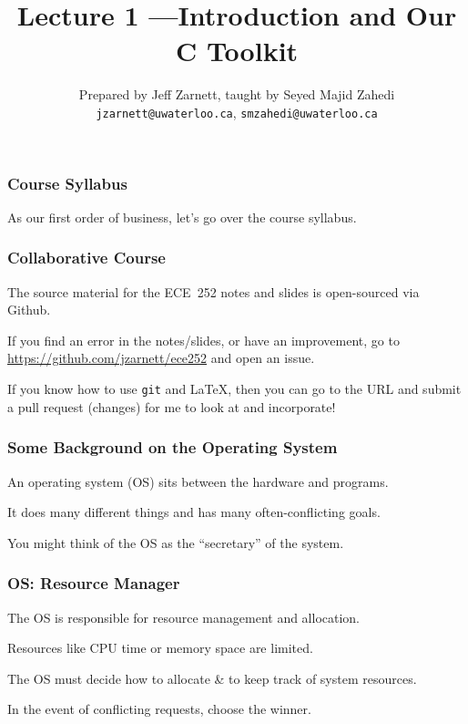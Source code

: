 

\title{Lecture 1 ---Introduction and Our C Toolkit }

\author{Prepared by Jeff Zarnett, taught by Seyed Majid Zahedi \\ \small \texttt{jzarnett@uwaterloo.ca}, \texttt{smzahedi@uwaterloo.ca}}
\date{}




\begin{frame}
	\titlepage

\end{frame}

\begin{frame}
	\frametitle{Course Syllabus}

	As our first order of business, let's go over the course syllabus.

\end{frame}

\begin{frame}
	\frametitle{Collaborative Course}

	The source material for the ECE~252 notes and slides is open-sourced via Github.

	If you find an error in the notes/slides, or have an improvement, go to \url{https://github.com/jzarnett/ece252} and open an issue.

	If you know how to use \texttt{git} and \LaTeX, then you can go to the URL and submit a pull request (changes) for me to look at and incorporate!


\end{frame}

\begin{frame}
	\frametitle{Some Background on the Operating System}

	An operating system (OS) sits between the hardware and programs.

	It does many different things and has many often-conflicting goals.

	You might think of the OS as the ``secretary'' of the system.

\end{frame}

\begin{frame}
	\frametitle{OS: Resource Manager}

	The OS is responsible for resource management and allocation.

	Resources like CPU time or memory space are limited.

	The OS must decide how to allocate \& to keep track of system resources.

	In the event of conflicting requests, choose the winner.


\end{frame}

